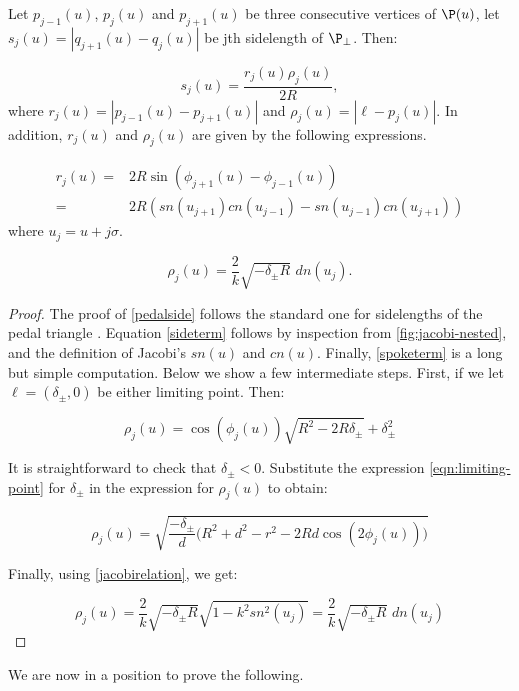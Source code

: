 \begin{lemma}
\label{lem:pedal-perimeter}
 Let $p_{j-1}(u)$, $p_{j}(u)$ and $p_{j+1}(u)$ be three consecutive vertices of $\P(u)$, let $s_{j}(u)=|q_{j+1}(u)- q_{j}(u)|$ be jth sidelength of $\P_{\perp}$. Then:

\begin{equation}
\label{pedalside}
s_{j}(u)=\frac{r_{j}(u)\rho_{j}(u)}{2R},
\end{equation}
%
where $r_{j}(u)=\left|p_{j-1}(u)-p_{j+1}(u)\right|$ and $\rho_{j}(u)=\left|\ell-p_{j}(u)\right|$. In addition, $r_{j}(u)$ and $\rho_{j}(u)$ are given by the following expressions.
  
\begin{align}
r_{j}(u)=&2R\sin{(\phi_{j+1}(u)-\phi_{j-1}(u))} \label{sideterm} \\
=&2R\left(sn(u_{j+1})cn(u_{j-1})-sn(u_{j-1})cn(u_{j+1})\right) \nonumber
\end{align} 
where $u_{j}=u+j \sigma$.

\begin{equation}
\label{spoketerm}
\rho_{j}(u)=\frac{2}{k}\sqrt{-\delta_{\pm}R}\,\,dn(u_{j}).
\end{equation}
\end{lemma}
\begin{proof}
The proof of \eqref{pedalside} follows the standard one for sidelengths of the pedal triangle \cite[pp. 135--141]{johnson1960}. Equation \eqref{sideterm} follows by inspection from \cref{fig:jacobi-nested}, and the definition of Jacobi's $sn(u)$ and $cn(u)$. Finally, \eqref{spoketerm} is a long but simple computation. Below we show a few intermediate steps. First, if we let $\ell=(\delta_{\pm},0)$ be either limiting point. Then:

\[\rho_{j}(u)=\cos(\phi_{j}(u))\sqrt{R^2-2R\delta_{\pm}}+\delta_{\pm}^2\]

It is straightforward to check that $\delta_{\pm}<0$. Substitute the expression \eqref{eqn:limiting-point} for $\delta_{\pm}$ in the expression for $\rho_{j}(u)$ to obtain:

\[\rho_{j}(u)=\sqrt{\frac{-\delta_{\pm}}{d}\Big( R^2+d^2-r^2-2Rd\cos{(2\phi_{j}(u))}\Big)}\]

Finally, using \eqref{jacobirelation}, we get:

\[\rho_{j}(u)=\frac{2}{k}\sqrt{-\delta_{\pm}R}\sqrt{1-k^2sn^2(u_{j})}=\frac{2}{k}\sqrt{-\delta_{\pm}R}\,\,dn(u_{j})\] 
\end{proof}

We are now in a position to prove the following.

